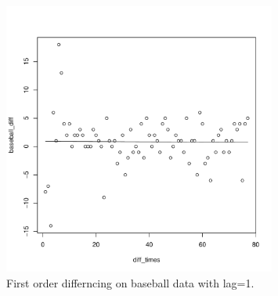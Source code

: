 \documentclass[12pt]{article}
\newenvironment{solution}[2][Solution]{\begin{trivlist}
\item[\hskip \labelsep {\bfseries #1}]}{\end{trivlist}}
\begin{document}
\begin{solution}{}
\begin{figure}
    \centering
    \includegraphics[width=0.8\textwidth]{figs/problem_10/baseball_diff_lag1.pdf}
    \vspace*{-0.5cm}
    \caption{First order differncing on baseball data with lag=1.}
    \label{fig:baseball_diff}
\end{figure}

\end{solution}
\end{document}
